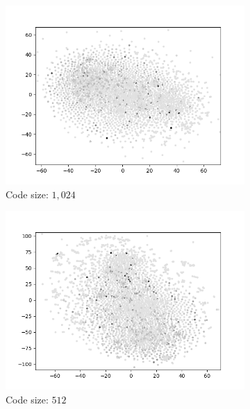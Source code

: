 \begin{figure}[H]
\begin{subfigure}{.25\textwidth}
        \includegraphics[width=\textwidth]{images/figures/experiments_latent/pooling_dim1024_dsm.png}
        \caption{Code size: $1,024$}
    \end{subfigure}%
    \begin{subfigure}{.25\textwidth}
        \centering
        \includegraphics[width=\textwidth]{images/figures/experiments_latent/pooling_dim512_dsm.png}
        \caption{Code size: $512$}
    \end{subfigure}%
    \begin{subfigure}{.25\textwidth}
        \centering

\end{subfigure}
\end{figure}
